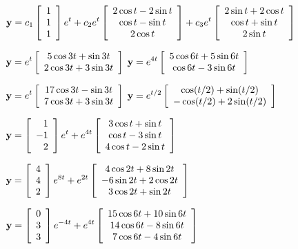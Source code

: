 \smallskip
{}
$\displaystyle{{\bf y}=c_{1}\left[\begin{array}{c}1\\1\\1
\end{array}\right]e^{t}+
c_{2}e^{t}\left[\begin{array}{c}2\cos t-2\sin t
\\\cos t-\sin t\\2\cos t\end{array}\right]+
c_{3}e^{t}\left[\begin{array}{ccc}2\sin t+2\cos t\\\cos t+\sin t\\
2\sin t\end{array}\right]}$

\smallskip
{}
$\displaystyle{{\bf y}=e^{t}\left[\begin{array}{c}
5\cos3t+\sin3t\\2\cos3t+3\sin3t\end{array}\right]}$
$\displaystyle{{\bf
y}=e^{4t}\left[\begin{array}{c}5\cos6t+5\sin6t\\\cos6t-3\sin6t
\end{array}\right]}$

\smallskip
{}
$\displaystyle{{\bf
y}=e^{t}\left[\begin{array}{c}17\cos3t-\sin3t\\7\cos3t+3\sin3t
\end{array}\right]}$
${\bf y}=\displaystyle{e^{t/2}\left[\begin{array}{c}\cos(t/2)+
\sin(t/2)\\-\cos(t/2)+2\sin(t/2)
\end{array}\right]}$

\smallskip
{}
$\displaystyle{{\bf y}=\left[\begin{array}{r}1\\-1\\2\end{array}\right]e^{t}
+e^{4t}\left[\begin{array}{c}3\cos t+\sin t\\\cos
t-3\sin t\\4\cos t-2\sin t\end{array}\right]}$

\smallskip
{}
$\displaystyle{{\bf y}=\left[\begin{array}{r}4\\4\\2\end{array}\right]e^{8t}
+e^{2t}\left[\begin{array}{c}4\cos2t+8\sin2t\\-6\sin2t+2\cos2t\\3\cos2t+\sin2t
\end{array}\right]}$

\smallskip
{}
$\displaystyle{{\bf y}=\left[\begin{array}{r}0\\3\\3\end{array}\right]e^{-4t}
+e^{4t}\left[\begin{array}{c}15\cos6t
+10\sin6t\\14\cos6t-8\sin6t\\7\cos6t-4\sin6
t\end{array}\right]}$

